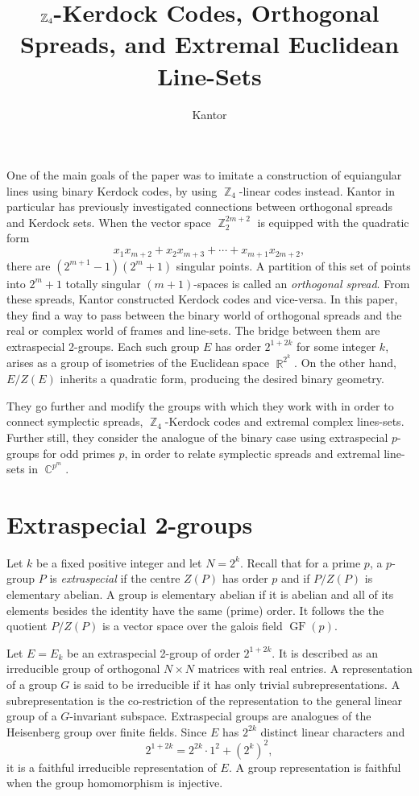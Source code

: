 \documentclass[a4paper]{article}
\title{$\Z_4$-Kerdock Codes, Orthogonal Spreads, and
Extremal Euclidean Line-Sets}
\author{Kantor}
\DeclareMathOperator{\R}{\mathbb{R}}
\DeclareMathOperator{\C}{\mathbb{C}}
\DeclareMathOperator{\Z}{\mathbb{Z}}
\DeclareMathOperator{\GF}{GF}
\begin{document}
  \maketitle
  
  One of the main goals of the paper was to imitate a
  construction of equiangular lines using binary Kerdock
  codes, by using $\Z_4$-linear codes instead. Kantor in
  particular has previously investigated connections between
  orthogonal spreads and Kerdock sets. When the vector space
  $\Z_2^{2m+2}$ is equipped with the quadratic form
  \[
    x_1x_{m+2} + x_2x_{m+3}+\cdots + x_{m+1}x_{2m+2},
  \] 
  there are $(2^{m+1}-1)(2^{m}+1)$ singular points. A
  partition of this set of points into $2^{m}+1$ totally
  singular $(m+1)$-spaces is called an \textit{orthogonal
  spread}. From these spreads, Kantor constructed Kerdock
  codes and vice-versa. In this paper, they find a way to
  pass between the binary world of orthogonal spreads and
  the real or complex world of frames and line-sets. The
  bridge between them are extraspecial 2-groups. Each such
  group $E$ has order $2^{1+2k}$ for some integer $k$,
  arises as a group of isometries of the Euclidean space
  $\R^{2^{k}}$. On the other hand, $E / Z(E)$ inherits a
  quadratic form, producing the desired binary geometry.

  They go further and modify the groups with which they work
  with in order to connect symplectic spreads,
  $\Z_4$-Kerdock codes and extremal complex lines-sets.
  Further still, they consider the analogue of the binary
  case using extraspecial $p$-groups for odd primes $p$, in
  order to relate symplectic spreads and extremal line-sets
  in $\C^{p^{m}}$.

  \section{Extraspecial 2-groups}

  Let $k$ be a fixed positive integer and let $N = 2^{k}$.
  Recall that for a prime $p$, a $p$-group $P$ is
  \textit{extraspecial} if the centre $Z(P)$ has order $p$ 
  and if $P / Z(P)$ is elementary abelian. A group is
  elementary abelian if it is abelian and all of its
  elements besides the identity have the same (prime) order.
  It follows the the quotient $P / Z(P)$ is a vector space
  over the galois field $\GF(p)$.

  Let  $E = E_k$ be an extraspecial 2-group of order
  $2^{1+2k}$. It is described as an irreducible group of
  orthogonal $N \times N$ matrices with real entries. A
  representation of a group $G$ is said to be irreducible if
  it has only trivial subrepresentations. A
  subrepresentation is the co-restriction of the
  representation to the general linear group of a
  $G$-invariant subspace. Extraspecial groups are analogues
  of the Heisenberg group over finite fields. Since $E$ has
  $2^{2k}$ distinct linear characters and
  \[
    2^{1+2k} = 2^{2k} \cdot 1^2 + (2^{k})^2,
  \] 
  it is a faithful irreducible representation of $E$. A
  group representation is faithful when the group
  homomorphism is injective.
\end{document}
